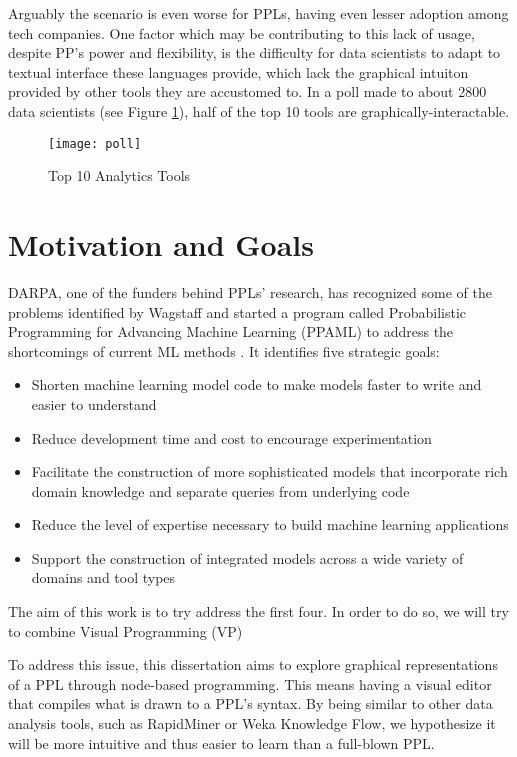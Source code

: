 Arguably the scenario is even worse for PPLs, having even lesser adoption
among tech companies. One factor which may be contributing to this lack of
usage, despite PP's power and flexibility, is the difficulty for data scientists
to adapt to textual interface these languages provide, which lack the graphical
intuiton provided by other tools they are accustomed to. In a poll made to about 2800
data scientists (see Figure \ref{fig:poll}), half of the top 10 tools are
graphically-interactable.

\begin{figure}[t]
  \begin{center}
    \leavevmode
    \texttt{[image: poll]}
    \caption{Top 10 Analytics Tools \cite{kdn}}
    \label{fig:poll}
  \end{center}
\end{figure}

\section{Motivation and Goals} \label{sec:goals}

DARPA, one of the funders behind PPLs' research, has recognized some of the problems
identified by Wagstaff and started a program called Probabilistic Programming
for Advancing Machine Learning (PPAML) to address the shortcomings of
current ML methods \cite{darpa}. It identifies five strategic goals:

\begin{itemize}
  \item Shorten machine learning model code to make models faster to write and
  easier to understand
  \item Reduce development time and cost to encourage experimentation
  \item Facilitate the construction of more sophisticated models that
  incorporate rich domain knowledge and separate queries from underlying code
  \item Reduce the level of expertise necessary to build machine learning
  applications
  \item Support the construction of integrated models across a wide variety of
  domains and tool types
\end{itemize}

The aim of this work is to try address
the first four. In order to do so, we will try to combine Visual Programming
(VP)

To address this issue, this dissertation aims to explore graphical
representations of a PPL through node-based programming.
This means having a visual editor that compiles what is drawn to a PPL’s syntax.
By being similar to other data analysis tools, such as RapidMiner or
Weka Knowledge Flow, we hypothesize it will be more intuitive and thus easier
to learn than a full-blown PPL.

